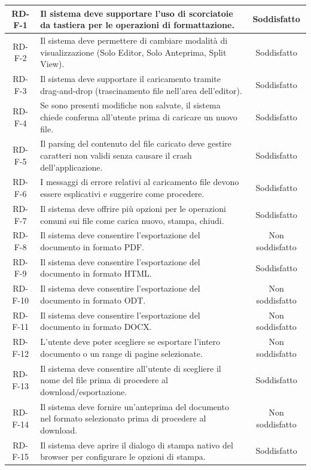 \documentclass[11pt,a4paper]{article}
\begin{document}
\begin{longtable}{|c|p{11cm}|c|}
RD-F-1 & Il sistema deve supportare l'uso di scorciatoie da tastiera per le operazioni di formattazione. & Soddisfatto \\
\hline
RD-F-2 & Il sistema deve permettere di cambiare modalità di visualizzazione (Solo Editor, Solo Anteprima, Split View). & Soddisfatto \\
\hline
RD-F-3 & Il sistema deve supportare il caricamento tramite drag-and-drop (trascinamento file nell'area dell'editor). & Soddisfatto \\
\hline
RD-F-4 & Se sono presenti modifiche non salvate, il sistema chiede conferma all'utente prima di caricare un nuovo file. & Soddisfatto\\
\hline
RD-F-5 & Il parsing del contenuto del file caricato deve gestire caratteri non validi senza causare il crash dell'applicazione. & Soddisfatto \\
\hline
RD-F-6 & I messaggi di errore relativi al caricamento file devono essere esplicativi e suggerire come procedere. & Soddisfatto \\
\hline
RD-F-7 & Il sistema deve offrire più opzioni per le operazioni comuni sui file come carica nuovo, stampa, chiudi. & Soddisfatto \\
\hline
RD-F-8 & Il sistema deve consentire l'esportazione del documento in formato PDF. & Non soddisfatto \\
\hline
RD-F-9 & Il sistema deve consentire l'esportazione del documento in formato HTML. & Soddisfatto \\
\hline
RD-F-10 & Il sistema deve consentire l'esportazione del documento in formato ODT. & Non soddisfatto \\
\hline
RD-F-11 & Il sistema deve consentire l'esportazione del documento in formato DOCX. & Non soddisfatto \\
\hline
RD-F-12 & L'utente deve poter scegliere se esportare l'intero documento o un range di pagine selezionate. & Non soddisfatto \\
\hline
RD-F-13 & Il sistema deve consentire all'utente di scegliere il nome del file prima di procedere al download/esportazione. & Soddisfatto \\
\hline
RD-F-14 & Il sistema deve fornire un'anteprima del documento nel formato selezionato prima di procedere al download. & Non soddisfatto \\
\hline
RD-F-15 & Il sistema deve aprire il dialogo di stampa nativo del browser per configurare le opzioni di stampa. & Soddisfatto \\
\hline


\end{longtable}
\end{document}
